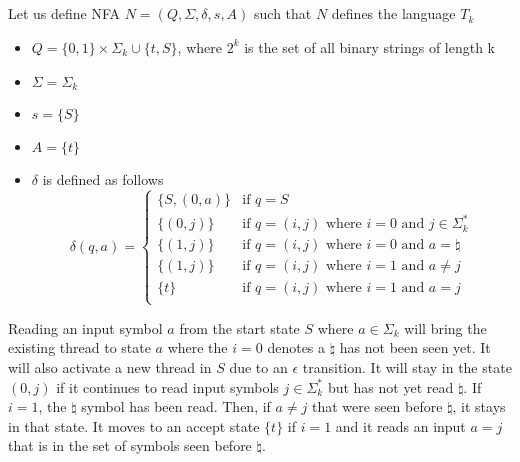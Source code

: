 \documentclass[11pt]{article}
\begin{document}
\subsection*{}
Let us define NFA $N=(Q,\Sigma,\delta,s,A)$ such that $N$ defines the language $T_k$
\begin{itemize}
	\item $Q=\{0, 1\} \times \Sigma_k \cup\{t,S\}$, where $2^k$ is the set of all binary strings of length k 
	\item $\Sigma=\Sigma_k$
	\item $s=\{S\}$
	\item $A=\{t\}$
	\item $\delta$ is defined as follows \\ \[\delta(q,a)=\begin{cases}
		\{S, (0,a)\} & \text{if }q=S \\
        \{(0, j)\} & \text{if }q=(i, j)\text{ where }i=0\text{ and }j\in\Sigma_k^* \\
		\{(1,j)\} & \text{if }q=(i, j)\text{ where }i=0\text{ and }a=\natural \\
		\{(1,j)\} & \text{if }q=(i, j)\text{ where }i=1\text{ and }a\neq j \\
		\{t\} & \text{if }q=(i, j)\text{ where }i=1\text{ and }a=j \\
	\end{cases}\]
\end{itemize}
Reading an input symbol $a$ from the start state $S$ where $a \in\Sigma_k$ will bring the existing thread to state $a$ where the $i=0$ denotes a $\natural$ has not been seen yet. It will also activate a new thread in $S$ due to an $\epsilon$ transition. It will stay in the state $(0, j)$ if it continues to read input symbols $j\in \Sigma_k^*$ but has not yet read $\natural$.
If $i=1$, the $\natural$ symbol has been read. Then, if $a\neq j$ that were seen before $\natural$, it stays in that state. It moves to an accept state $\{t\}$ if $i=1$ and it reads an input $a=j$ that is in the set of symbols seen before $\natural$.
\end{document}
